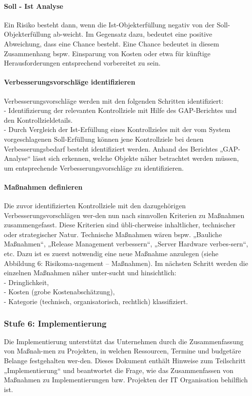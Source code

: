\paragraph{Soll - Ist Analyse}
Ein Risiko besteht dann, wenn die Ist-Objekterfüllung negativ von der Soll-Objekterfüllung ab-weicht. Im Gegensatz dazu, bedeutet eine positive Abweichung, dass eine Chance besteht. Eine Chance bedeutet in diesem Zusammenhang bspw. Einsparung von Kosten oder etwa für künftige Herausforderungen entsprechend vorbereitet zu sein.

\paragraph{Verbesserungsvorschläge identifizieren}
Verbesserungsvorschläge werden mit den folgenden Schritten identifiziert:\\
- Identifizierung der relevanten Kontrollziele mit Hilfe des GAP-Berichtes und den Kontrollzieldetails.
\\- Durch Vergleich der Ist-Erfüllung eines Kontrollzieles mit der vom System vorgeschlagenen Soll-Erfüllung können jene Kontrollziele bei denen Verbesserungsbedarf besteht identifiziert werden.
Anhand des Berichtes „GAP-Analyse“ lässt sich erkennen, welche Objekte näher betrachtet werden müssen, um entsprechende Verbesserungsvorschläge zu identifizieren.
\paragraph{Maßnahmen definieren}
Die zuvor identifizierten Kontrollziele mit den dazugehörigen Verbesserungsvorschlägen wer-den nun nach sinnvollen Kriterien zu Maßnahmen zusammengefasst. Diese Kriterien sind übli-cherweise inhaltlicher, technischer oder strategischer Natur. Technische Maßnahmen wären bspw. „Bauliche Maßnahmen“, „Release Management verbessern“, „Server Hardware verbes-sern“, etc.
Dazu ist es zuerst notwendig eine neue Maßnahme anzulegen (siehe Abbildung 6: Risikoma-nagement – Maßnahmen). Im nächsten Schritt werden die einzelnen Maßnahmen näher unter-sucht und hinsichtlich:\\
- Dringlichkeit,\\
- Kosten (grobe Kostenabschätzung),\\
- Kategorie (technisch, organisatorisch, rechtlich)
klassifiziert.
\subsubsection{Stufe 6: Implementierung}
Die Implementierung unterstützt das Unternehmen durch die Zusammenfassung von Maßnah-men zu Projekten, in welchen Ressourcen, Termine und budgetäre Belange festgehalten wer-den.
Dieses Dokument enthält Hinweise zum Teilschritt „Implementierung“ und beantwortet die Frage, wie das Zusammenfassen von Maßnahmen zu Implementierungen bzw. Projekten der IT Organisation behilflich ist.

